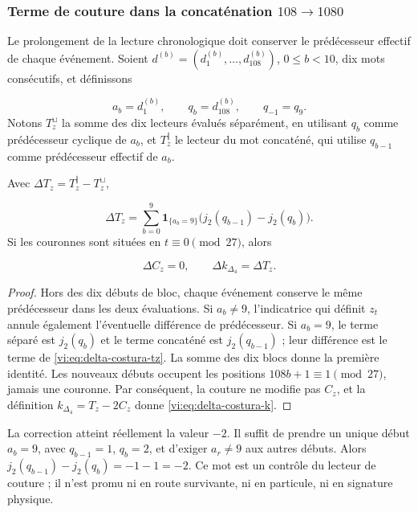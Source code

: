 \subsubsection{Terme de couture dans la concaténation \(108\to1080\)
}
\label{vi:subsubsec:costura-108-1080}

Le prolongement de la lecture chronologique doit conserver le prédécesseur
effectif de chaque événement. Soient
\(d^{(b)}=(d^{(b)}_1,\ldots,d^{(b)}_{108})\), \(0\le b<10\), dix
mots consécutifs, et définissons

\[
 a_b=d^{(b)}_1,\qquad q_b=d^{(b)}_{108},\qquad q_{-1}=q_9.
\]
Notons \(T_z^{\sqcup}\) la somme des dix lecteurs évalués
séparément, en utilisant \(q_b\) comme prédécesseur cyclique de \(a_b\), et
\(T_z^{\Vert}\) le lecteur du mot concaténé, qui utilise
\(q_{b-1}\) comme prédécesseur effectif de \(a_b\).


\begin{lemma}
\label{vi:lem:costura-108-1080}
Avec \(\Delta T_z=T_z^{\Vert}-T_z^{\sqcup}\),

\begin{equation}
 \Delta T_z=
 \sum_{b=0}^{9}\mathbf1_{\{a_b=9\}}
 \bigl(j_2(q_{b-1})-j_2(q_b)\bigr).
 \label{vi:eq:delta-costura-tz}
\end{equation}
Si les couronnes sont situées en \(t\equiv0\pmod{27}\), alors

\begin{equation}
 \Delta C_z=0,
 \qquad
 \Delta k_{\Delta_4}=\Delta T_z.
 \label{vi:eq:delta-costura-k}
\end{equation}
\end{lemma}

\begin{proof}
Hors des dix débuts de bloc, chaque événement conserve le même
prédécesseur dans les deux évaluations. Si \(a_b\ne9\), l’indicatrice qui définit
\(z_t\) annule également l’éventuelle différence de prédécesseur. Si \(a_b=9\),
le terme séparé est \(j_2(q_b)\) et le terme concaténé est
\(j_2(q_{b-1})\) ; leur différence est le terme de
\eqref{vi:eq:delta-costura-tz}. La somme des dix blocs donne la
première identité. Les nouveaux débuts occupent les positions
\(108b+1\equiv1\pmod{27}\), jamais une couronne. Par conséquent, la couture ne
modifie pas \(C_z\), et la définition
\(k_{\Delta_4}=T_z-2C_z\) donne
\eqref{vi:eq:delta-costura-k}.

\end{proof}

La correction atteint réellement la valeur \(-2\). Il suffit de prendre un unique
début \(a_b=9\), avec \(q_{b-1}=1\), \(q_b=2\), et d’exiger
\(a_r\ne9\) aux autres débuts. Alors
\(j_2(q_{b-1})-j_2(q_b)=-1-1=-2\). Ce mot est un contrôle du lecteur
de couture ; il n’est promu ni en route survivante, ni en particule, ni en signature
physique.


